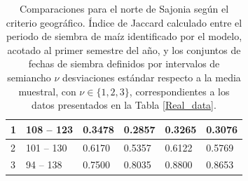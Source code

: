 \begin{table}[]
\begin{tabular}{llllll}
		\multicolumn{1}{l|}{1}                                  & \multicolumn{1}{l|}{108 -- 123}                                                                                               & \multicolumn{1}{l|}{0.3478}                  & \multicolumn{1}{l|}{0.2857}                 & \multicolumn{1}{l|}{0.3265}                  & 0.3076                 \\ \hline
		\multicolumn{1}{l|}{2}                                  & \multicolumn{1}{l|}{101 -- 130}                                                                                               & \multicolumn{1}{l|}{0.6170}                  & \multicolumn{1}{l|}{0.5357}                 & \multicolumn{1}{l|}{0.6122}                  & 0.5769                 \\ \hline
		\multicolumn{1}{l|}{3}                                  & \multicolumn{1}{l|}{94 -- 138}                                                                                                & \multicolumn{1}{l|}{0.7500}                  & \multicolumn{1}{l|}{0.8035}                 & \multicolumn{1}{l|}{0.8800}                  & 0.8653                 \\ \hline
	\end{tabular}
	\caption{Comparaciones para el norte de Sajonia según el criterio geográfico. Índice de Jaccard calculado entre el periodo de siembra de maíz identificado por el modelo, acotado al primer semestre del año, y los conjuntos de fechas de siembra definidos por intervalos de semiancho $\nu$ desviaciones estándar respecto a la media muestral, con $\nu\in\{1,2,3\}$, correspondientes a los datos presentados en la Tabla \ref{Real_data}.}
	\label{Tab:Comparions_North_Saxony_Geo}
\end{table}


